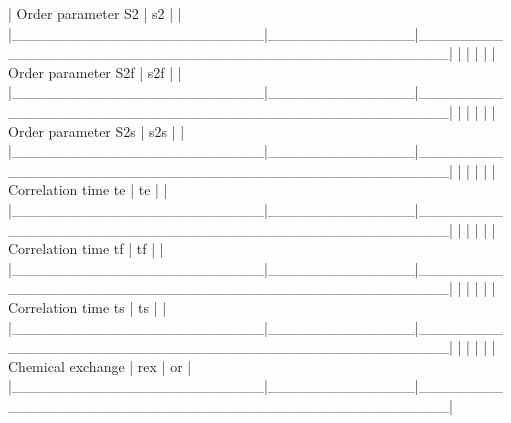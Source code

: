 | Order parameter S2     | s2           | 
                                        |
|\_\_\_\_\_\_\_\_\_\_\_\_\_\_\_\_\_\_\_\_\_\_\_\_|\_\_\_\_\_\_\_\_\_\_\_\_\_\_|\_\_\_\_\_\_\_\_\_\_\_\_\_\_\_\_\_\_\_\_\_\_\_\_\_\_\_\_\_\_\_\_\_\_\_\_\_\_\_\_\_\_\_\_\_\_\_\_\_\_|
|                        |              |                                                  |
| Order parameter S2f    | s2f          | 
                                       |
|\_\_\_\_\_\_\_\_\_\_\_\_\_\_\_\_\_\_\_\_\_\_\_\_|\_\_\_\_\_\_\_\_\_\_\_\_\_\_|\_\_\_\_\_\_\_\_\_\_\_\_\_\_\_\_\_\_\_\_\_\_\_\_\_\_\_\_\_\_\_\_\_\_\_\_\_\_\_\_\_\_\_\_\_\_\_\_\_\_|
|                        |              |                                                  |
| Order parameter S2s    | s2s          | 
                                       |
|\_\_\_\_\_\_\_\_\_\_\_\_\_\_\_\_\_\_\_\_\_\_\_\_|\_\_\_\_\_\_\_\_\_\_\_\_\_\_|\_\_\_\_\_\_\_\_\_\_\_\_\_\_\_\_\_\_\_\_\_\_\_\_\_\_\_\_\_\_\_\_\_\_\_\_\_\_\_\_\_\_\_\_\_\_\_\_\_\_|
|                        |              |                                                  |
| Correlation time te    | te           | 
                                           |
|\_\_\_\_\_\_\_\_\_\_\_\_\_\_\_\_\_\_\_\_\_\_\_\_|\_\_\_\_\_\_\_\_\_\_\_\_\_\_|\_\_\_\_\_\_\_\_\_\_\_\_\_\_\_\_\_\_\_\_\_\_\_\_\_\_\_\_\_\_\_\_\_\_\_\_\_\_\_\_\_\_\_\_\_\_\_\_\_\_|
|                        |              |                                                  |
| Correlation time tf    | tf           | 
                                           |
|\_\_\_\_\_\_\_\_\_\_\_\_\_\_\_\_\_\_\_\_\_\_\_\_|\_\_\_\_\_\_\_\_\_\_\_\_\_\_|\_\_\_\_\_\_\_\_\_\_\_\_\_\_\_\_\_\_\_\_\_\_\_\_\_\_\_\_\_\_\_\_\_\_\_\_\_\_\_\_\_\_\_\_\_\_\_\_\_\_|
|                        |              |                                                  |
| Correlation time ts    | ts           | 
                                           |
|\_\_\_\_\_\_\_\_\_\_\_\_\_\_\_\_\_\_\_\_\_\_\_\_|\_\_\_\_\_\_\_\_\_\_\_\_\_\_|\_\_\_\_\_\_\_\_\_\_\_\_\_\_\_\_\_\_\_\_\_\_\_\_\_\_\_\_\_\_\_\_\_\_\_\_\_\_\_\_\_\_\_\_\_\_\_\_\_\_|
|                        |              |                                                  |
| Chemical exchange      | rex          | 
 or 
       |
|\_\_\_\_\_\_\_\_\_\_\_\_\_\_\_\_\_\_\_\_\_\_\_\_|\_\_\_\_\_\_\_\_\_\_\_\_\_\_|\_\_\_\_\_\_\_\_\_\_\_\_\_\_\_\_\_\_\_\_\_\_\_\_\_\_\_\_\_\_\_\_\_\_\_\_\_\_\_\_\_\_\_\_\_\_\_\_\_\_|
